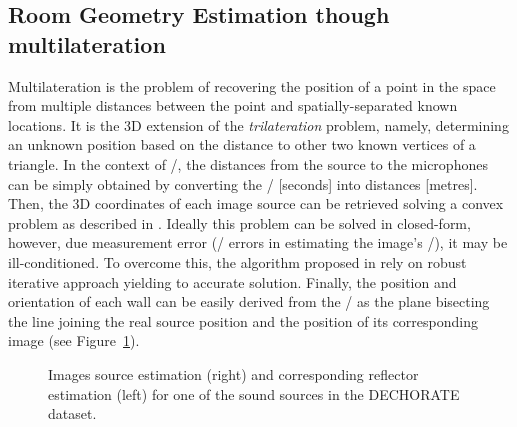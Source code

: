 \subsection{Room Geometry Estimation though multilateration}
Multilateration is the problem of recovering the position of a point in the space from multiple distances between the point and spatially-separated known locations.
It is the 3D extension of the \textit{trilateration} problem, namely, determining an unknown position based on the distance to other two known vertices of a triangle.
In the context of \RooGE/, the distances from the source to the microphones can be simply obtained by converting the \TOAs/ [seconds] into distances [metres].
Then, the 3D coordinates of each image source can be retrieved solving a convex problem as described in .
Ideally this problem can be solved in closed-form, however, due measurement error (\eg/ errors in estimating the image's \TOAs/), it may be ill-conditioned.
To overcome this, the algorithm proposed in  rely on robust iterative approach yielding to accurate solution.
Finally, the position and orientation of each wall can be easily derived from the \ISM/ as the plane bisecting the line joining the real source position and the position of its corresponding image (see Figure~\ref{fig:dechorateapp:wall_rec}).

\begin{figure}[t]
    \begin{fullwidth}
    \centering
    \hfill
    \caption{Images source estimation (right) and corresponding reflector estimation (left) for one of the sound sources in the \acs{DECHORATE} dataset.}
    \label{fig:dechorateapp:wall_rec}
    \end{fullwidth}
\end{figure}

